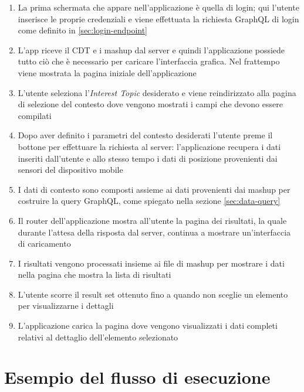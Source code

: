\begin{enumerate}
	\item
	La prima schermata che appare nell'applicazione è quella di login; qui l'utente inserisce le proprie credenziali e viene effettuata la richiesta GraphQL di login come definito in \ref{sec:login-endpoint}
	\item
	L'app riceve il CDT e i mashup dal server e quindi l'applicazione possiede tutto ciò che è necessario per caricare l'interfaccia grafica. Nel frattempo viene mostrata la pagina iniziale dell'applicazione
	\item
	L'utente seleziona l'\emph{Interest Topic} desiderato e viene reindirizzato alla pagina di selezione del contesto dove vengono mostrati i campi che devono essere compilati
	\item
	Dopo aver definito i parametri del contesto desiderati l'utente preme il bottone per effettuare la richiesta al server: l'applicazione recupera i dati inseriti dall'utente e allo stesso tempo i dati di posizione provenienti dai sensori del dispositivo mobile
	\item
	I dati di contesto sono composti assieme ai dati provenienti dai mashup per costruire la query GraphQL, come spiegato nella sezione \ref{sec:data-query}
	\item
	Il router dell'applicazione mostra all'utente la pagina dei risultati, la quale durante l'attesa della risposta dal server, continua a mostrare un'interfaccia di caricamento
	\item
	I risultati vengono processati insieme ai file di mashup per mostrare i dati nella pagina che mostra la lista di risultati
	\item
	L'utente scorre il result set ottenuto fino a quando non sceglie un elemento per visualizzarne i dettagli
	\item
	L'applicazione carica la pagina dove vengono visualizzati i dati completi relativi al dettaglio dell'e\-le\-men\-to selezionato 
\end{enumerate}

\section{Esempio del flusso di esecuzione}

